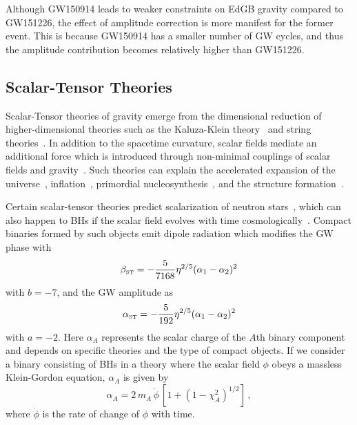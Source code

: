 \documentclass[prd,twocolumn,nofootinbib]{revtex4-1}
\newcommand\be{\begin{equation}}
\newcommand\ee{\end{equation}}
\newcommand{\EDGB}{{\mbox{\tiny EdGB}}}
\newcommand{\ST}{{\mbox{\tiny ST}}}
\begin{document}
Although GW150914 leads to weaker constraints on EdGB gravity compared to GW151226, the effect of amplitude correction is more manifest for the former event. This is because GW150914 has a smaller number of GW cycles, and thus the amplitude contribution becomes relatively higher than GW151226.


\subsection{Scalar-Tensor Theories}
Scalar-Tensor theories of gravity emerge from the dimensional reduction of higher-dimensional theories such as the Kaluza-Klein theory~\cite{Fujii:2003pa,Overduin:1998pn} and string theories~\cite{polchinski1,polchinski2}. In addition to the spacetime curvature, scalar fields mediate an additional force which is introduced through non-minimal couplings of scalar fields and gravity~\cite{Berti:2015itd,Chiba:1997ms,PhysRevD.6.2077}. Such theories can explain the accelerated expansion of the universe~\cite{Brax:2004qh,PhysRevD.73.083510,PhysRevD.62.123510,PhysRevD.66.023525,Schimd:2004nq}, inflation~\cite{Burd:1991ns,Barrow:1990nv,Clifton:2011jh}, primordial nucleosynthesis~\cite{Coc:2006rt,Damour:1998ae,Larena:2005tu,Torres:1995je}, and the structure formation~\cite{Brax:2005ew}. 

Certain scalar-tensor theories predict scalarization of neutron stars~\cite{PhysRevLett.70.2220,Barausse:2012da}, which can also happen to BHs if the scalar field evolves with time cosmologically~\cite{Jacobson:1999vr,Horbatsch:2011ye}. Compact binaries formed by such objects emit dipole radiation which modifies the GW phase with~\cite{Freire:2012mg,Wex:2014nva,Tahura:2018zuq}
\be\label{eq:betaST}
\beta_{\ST}=-\frac{5}{7168}\eta ^{2/5}(\alpha_1-\alpha_2)^2
\ee
with $b=-7$, and the GW amplitude as~\cite{Tahura:2018zuq}
\be\label{eq:alphaST}
\alpha_{\ST}=-\frac{5}{192}\eta ^{2/5}(\alpha_1-\alpha_2)^2
\ee
with $a=-2$. Here $\alpha_A$ represents the scalar charge of the $A$th binary component and depends on specific theories and the type of compact objects. If we consider a binary consisting of BHs in a theory where the scalar field $\phi$ obeys a massless Klein-Gordon equation, $\alpha_A$ is given by~\cite{Horbatsch:2011ye}
\be\label{eq:alpha_A}
\alpha_A = 2 \, m_A \, \dot \phi\, [1+(1-\chi_A^2)^{1/2}]\,,
\ee
where $\dot{\phi}$ is the rate of change of $\phi$ with time.
\end{document}
